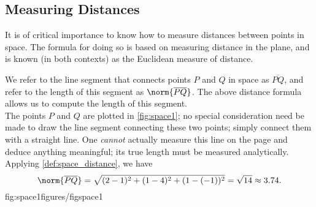 \subsection*{Measuring Distances}

It is of critical importance to know how to measure distances between points in space. The formula for doing so is based on measuring distance in the plane, and is known (in both contexts) as the Euclidean measure of distance.


We refer to the line segment that connects points $P$ and $Q$ in space as $\overline{PQ}$, and refer to the length of this segment as $\norm{\overline{PQ}}$. The above distance formula allows us to compute the length of this segment.\\

{The points $P$ and $Q$ are plotted in \autoref{fig:space1}; no special consideration need be made to draw the line segment connecting these two points; simply connect them with a straight line. One \textit{cannot} actually measure this line on the page and deduce anything meaningful; its true length must be measured analytically. Applying \autoref{def:space_distance}, we have
$$\norm{\overline{PQ}}= \sqrt{(2-1)^2+(1-4)^2+(1-(-1))^2} = \sqrt{14}\approx 3.74.$$
%
{fig:space1}{figures/figspace1}}

